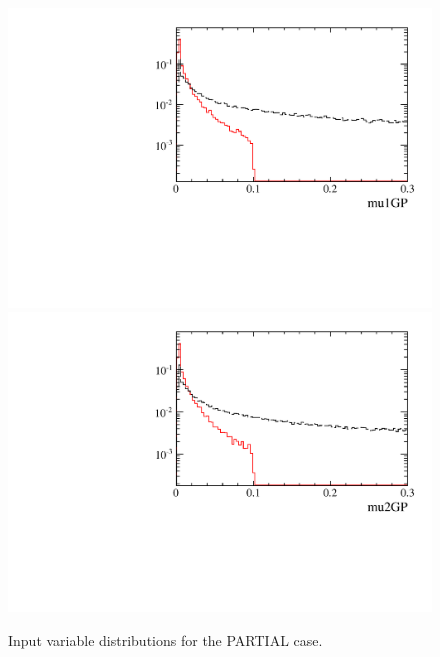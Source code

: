 \begin{figure} [htb!]
\begin{center}
\includegraphics[scale=0.20]{figs/mu1GPPARTIAL.pdf}
\includegraphics[scale=0.20]{figs/mu2GPPARTIAL.pdf}
\caption{Input variable distributions for the PARTIAL case.
\label{fig:MVAhistos_PARTIAL}}
\end{center}
\end{figure}

